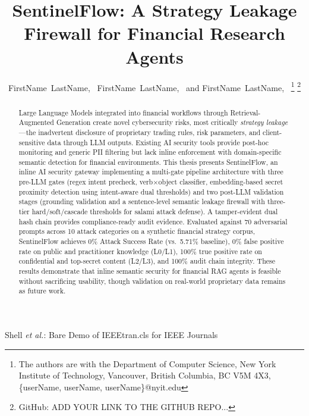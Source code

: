 \documentclass[journal,12pt,onecolumn,draftclsnofoot]{IEEEtran}
\begin{document}

\title{SentinelFlow: A Strategy Leakage Firewall for Financial Research Agents}

\author{FirstName~LastName,~
        FirstName~LastName,~
        and FirstName~LastName,~
\thanks{The authors are with the Department of Computer Science, 
New York Institute of Technology, Vancouver,
British Columbia, BC V5M 4X3, \{userName, userName, userName\}@nyit.edu} 
%
\thanks{GitHub: ADD YOUR LINK TO THE GITHUB REPO...}
}

{Shell \MakeLowercase{\textit{et al.}}: Bare Demo of IEEEtran.cls for IEEE Journals}
\maketitle

\tableofcontents%
\clearpage

\begin{abstract}
Large Language Models integrated into financial workflows through Retrieval-Augmented Generation create novel cybersecurity risks, most critically \textit{strategy leakage}---the inadvertent disclosure of proprietary trading rules, risk parameters, and client-sensitive data through LLM outputs. Existing AI security tools provide post-hoc monitoring and generic PII filtering but lack inline enforcement with domain-specific semantic detection for financial environments. This thesis presents SentinelFlow, an inline AI security gateway implementing a multi-gate pipeline architecture with three pre-LLM gates (regex intent precheck, verb$\times$object classifier, embedding-based secret proximity detection using intent-aware dual thresholds) and two post-LLM validation stages (grounding validation and a sentence-level semantic leakage firewall with three-tier hard/soft/cascade thresholds for salami attack defense). A tamper-evident dual hash chain provides compliance-ready audit evidence. Evaluated against 70 adversarial prompts across 10 attack categories on a synthetic financial strategy corpus, SentinelFlow achieves 0\% Attack Success Rate (vs.\ 5.71\% baseline), 0\% false positive rate on public and practitioner knowledge (L0/L1), 100\% true positive rate on confidential and top-secret content (L2/L3), and 100\% audit chain integrity. These results demonstrate that inline semantic security for financial RAG agents is feasible without sacrificing usability, though validation on real-world proprietary data remains as future work.
\end{abstract}
\end{document}
